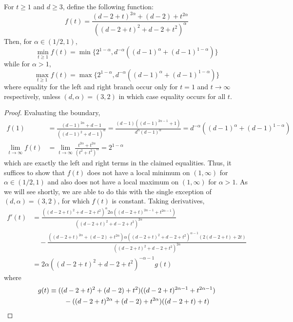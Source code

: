 \documentclass[11pt]{article}
\begin{document}
\begin{lemma}\label{lemma:m1-min}
   For $t\geq 1$ and $d\geq 3$, define the following function:
   $$f(t)=\frac{(d-2+t)^{2\alpha}+(d-2)+t^{2\alpha}}{((d-2+t)^{2}+d-2+t^2)^\alpha}$$
   Then, for $\alpha \in (1/2,1)$,
   $$\min_{t\geq 1}f(t)=\min\{2^{1-\alpha},d^{-\alpha}((d-1)^\alpha+(d-1)^{1-\alpha})\}$$
   while for $\alpha > 1$, 
   $$\max_{t\geq 1}f(t)=\max\{2^{1-\alpha},d^{-\alpha}((d-1)^\alpha+(d-1)^{1-\alpha})\}$$
   where equality for the left and right branch occur only for $t=1$ and $t\to \infty$ respectively, unless $(d,\alpha)=(3,2)$ in which case equality occurs for all $t$. 
\end{lemma}
\begin{proof}
Evaluating the boundary,
\begin{align*}
    f(1)&=\frac{(d-1)^{2\alpha}+d-1}{((d-1)^2+d-1)^\alpha}=\frac{(d-1)((d-1)^{2\alpha-1}+1)}{d^{\alpha}(d-1)^{\alpha}}=d^{-\alpha}((d-1)^{\alpha}+(d-1)^{1-\alpha})\\
    \lim_{t\to \infty}f(t)&=\lim_{t\to \infty}\frac{t^{2\alpha}+t^{2\alpha}}{(t^2 + t^2 )^\alpha}=2^{1-\alpha}
\end{align*}
which are exactly the left and right terms in the claimed equalities. Thus, it suffices to show that $f(t)$ does not have a local minimum on $(1,\infty)$ for $\alpha \in (1/2,1)$ and also does not have a local maximum on $(1,\infty)$ for $\alpha > 1$. As we will see shortly, we are able to do this with the single exception of $(d,\alpha)=(3,2)$, for which $f(t)$ is constant. Taking derivatives,
\begin{align*}
    f'(t)&=\frac{((d-2+t)^{2}+d-2+t^2)^{\alpha}2\alpha((d-2+t)^{2\alpha-1}+t^{2\alpha-1})}{((d-2+t)^{2}+d-2+t^2)^{2\alpha}}\\
    &\quad -\frac{((d-2+t)^{2\alpha}+(d-2)+t^{2\alpha})\alpha ((d-2+t)^{2}+d-2+t^2)^{\alpha-1}(2 (d-2+t)+2t)}{((d-2+t)^{2}+d-2+t^2)^{2\alpha}}\\
    &=2\alpha ((d-2+t)^{2}+d-2+t^2)^{-\alpha-1}g(t)
\end{align*}
where 
\begin{equation}\label{eq:m1-min-g-h}
\begin{aligned}
 g(t)&\equiv ((d-2+t)^{2}+(d-2)+t^2)((d-2+t)^{2\alpha-1}+t^{2\alpha-1})\\&
 \hspace{0.3in} -((d-2+t)^{2\alpha}+(d-2)+t^{2\alpha}) ( (d-2+t)+t)   \\

\end{aligned}
\end{equation}
\end{proof}
\end{document}
